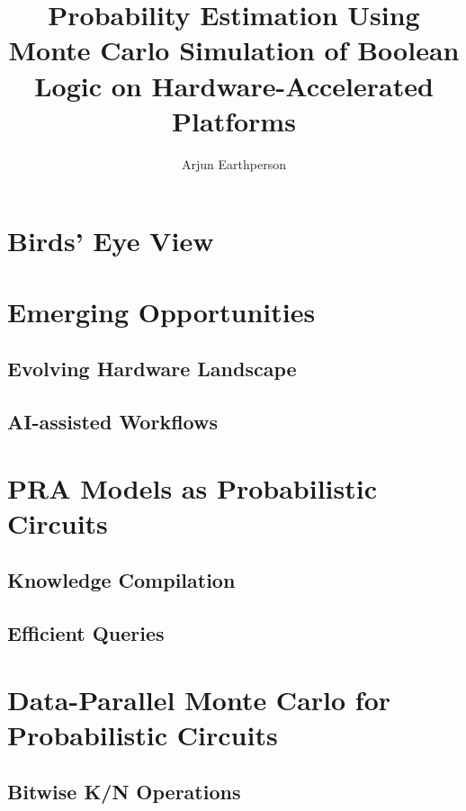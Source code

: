 \documentclass[aspectratio=169,xcolor=dvipsnames]{beamer}
\title{Probability Estimation Using Monte Carlo Simulation of Boolean Logic on Hardware-Accelerated Platforms}
\author{Arjun Earthperson}
\institute
{
    PhD Candidate, PRA Group\\
}
\begin{document}
\begin{frame}
    \titlepage
\end{frame}


\section*{Birds' Eye View}
\begin{frame}

    {\small{\tableofcontents}}
\end{frame}



\section{Emerging Opportunities}
\subsection{Evolving Hardware Landscape}
\subsection{AI-assisted Workflows}

\section{PRA Models as Probabilistic Circuits}
\subsection{Knowledge Compilation}
\subsection{Efficient Queries}

\section{Data-Parallel Monte Carlo for Probabilistic Circuits}
\subsection{Bitwise K/N Operations}
\end{document}
